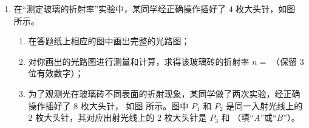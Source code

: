 \begin{enumerate}



\item 
{}
在“测定玻璃的折射率”实验中，某同学经正确操作插好了 $ 4 $ 枚大头针，如图  所示。
\begin{figure}[h!]
	\centering
\begin{subfigure}{0.4\linewidth}
	\centering
	 
	\caption{}\label{2012浙江21a}
\end{subfigure}
\begin{subfigure}{0.4\linewidth}
	\centering
	 
	\caption{}\label{2012浙江21b}
\end{subfigure}
\end{figure}

\begin{enumerate}
	\item
在答题纸上相应的图中画出完整的光路图；
\begin{figure}[h!]
	\centering
	
\end{figure}

\item 
对你画出的光路图进行测量和计算，求得该玻璃砖的折射率 $ n= $
 \underlinegap 
（保留 $ 3 $ 位有效数字）；


\item 
为了观测光在玻璃砖不同表面的折射现象，某同学做了两次实验，经正确操作插好了 $ 8 $ 枚大头针，
如图  所示。图中 $ P_{1} $ 和 $ P_{2} $ 是同一入射光线上的 $ 2 $ 枚大头针，其对应出射光线上的 $ 2 $ 枚大头针是 $ P_{3} $
和
 \underlinegap 
（填“$ A $”或“$ B $”）。

\end{enumerate}







\end{enumerate}

